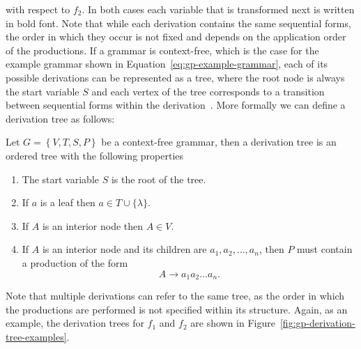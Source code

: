 with respect to $f_2$. 
In both cases each variable that is transformed next is written in bold font.
Note that while each derivation contains the same sequential forms, the order in which they occur is not fixed and depends on the application order of the productions.
If a grammar is context-free, which is the case for the example grammar shown in Equation~\ref{eq:gp-example-grammar}, each of its possible derivations can be represented as a tree, where the root node is always the start variable $S$ and each vertex of the tree corresponds to a transition between sequential forms within the derivation~\cite{linz2006introduction}.
More formally we can define a derivation tree as follows:
\begin{definition}\label{def:derivation-tree}
	Let $G = \left\{V, T, S, P\right\}$ be a context-free grammar, then a derivation tree is an ordered tree with the following properties
	\begin{enumerate}
		\item The start variable $S$ is the root of the tree.
		\item If $a$ is a leaf then $a \in T \cup \{\lambda \}$.
		\item If $A$ is an interior node then $A \in V$.
		\item If $A$ is an interior node and its children are $a_1, a_2, \dots, a_n$, then $P$ must contain a production of the form
		\begin{equation}
			A \to a_1 a_2 \dots a_n.
		\end{equation}  
	\end{enumerate}
\end{definition}
Note that multiple derivations can refer to the same tree, as the order in which the productions are performed is not specified within its structure.
Again, as an example, the derivation trees for $f_1$ and $f_2$ are shown in Figure~\ref{fig:gp-derivation-tree-examples}.
